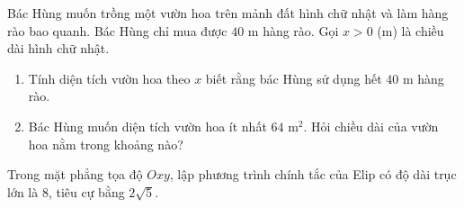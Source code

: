\begin{bt}%
	Bác Hùng muốn trồng một vườn hoa trên mảnh đất hình chữ nhật và làm hàng rào bao quanh. Bác Hùng chỉ mua được $40$ m hàng rào. Gọi $x>0$ (m) là chiều dài hình chữ nhật.
	\begin{enumerate}
		\item Tính diện tích vườn hoa theo $x$ biết rằng bác Hùng sử dụng hết $40$ m hàng rào.
		\item Bác Hùng muốn diện tích vườn hoa ít nhất $64$ m$^2$. Hỏi chiều dài của vườn hoa nằm trong khoảng nào?
	\end{enumerate}
\end{bt}

\begin{bt}%
	Trong mặt phẳng tọa độ $Oxy$, lập phương trình chính tắc của Elip có độ dài trục lớn là $8$, tiêu cự bằng $2\sqrt{5}$.
\end{bt}

